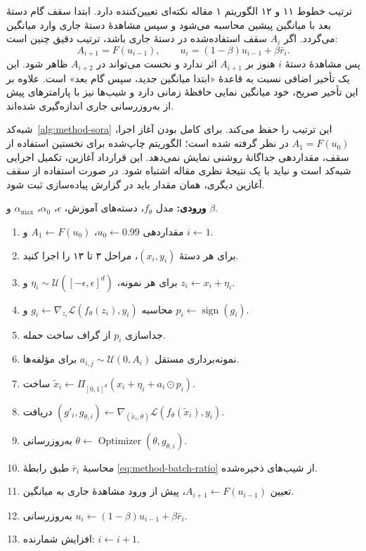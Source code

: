 ترتیب خطوط ۱۱ و ۱۲ الگوریتم ۱ مقاله نکته‌ای تعیین‌کننده دارد. ابتدا سقف گام دستهٔ بعد با میانگین پیشین محاسبه می‌شود و سپس مشاهدهٔ دستهٔ جاری وارد میانگین می‌گردد. اگر $A_i$ سقف استفاده‌شده در دستهٔ جاری باشد، ترتیب دقیق چنین است:
\begin{equation}
A_{i+1}=F(u_{i-1}),\qquad
u_i=(1-\beta)u_{i-1}+\beta\bar r_i.
\label{eq:method-extra-lag}
\end{equation}
پس مشاهدهٔ دستهٔ $i$ هنوز بر $A_{i+1}$ اثر ندارد و نخست می‌تواند در $A_{i+2}$ ظاهر شود. این یک تأخیر اضافی نسبت به قاعدهٔ «ابتدا میانگین جدید، سپس گام بعد» است. علاوه بر این تأخیر صریح، خود میانگین نمایی حافظهٔ زمانی دارد و شیب‌ها نیز با پارامترهای پیش از به‌روزرسانی جاری اندازه‌گیری شده‌اند.

شبه‌کد~\ref{alg:method-sora} این ترتیب را حفظ می‌کند. برای کامل بودن آغاز اجرا، $A_1=F(u_0)$ در نظر گرفته شده است؛ الگوریتم چاپ‌شده برای نخستین استفاده از سقف، مقداردهی جداگانهٔ روشنی نمایش نمی‌دهد. این قرارداد آغازین، تکمیل اجرایی شبه‌کد است و نباید با یک نتیجهٔ نظری مقاله اشتباه شود. در صورت استفاده از سقف آغازین دیگری، همان مقدار باید در گزارش پیاده‌سازی ثبت شود.

\begin{algorithm}[tbp]
\caption{بازنویسی \sora{} با حفظ ترتیب زمانی الگوریتم مقاله \cite{sora2026}}
\label{alg:method-sora}
\textbf{ورودی:} مدل $f_\theta$، دسته‌های آموزش، $\epsilon$، $\alpha_0$، $\alpha_{\max}$ و $\beta$.
\begin{enumerate}
\setlength{\itemsep}{0pt}
\item مقداردهی $u_0\gets0.99$، $A_1\gets F(u_0)$ و $i\gets1$.
\item برای هر دستهٔ $(x_i,y_i)$، مراحل ۳ تا ۱۳ را اجرا کنید.
\item برای هر نمونه، $\eta_i\sim\mathcal{U}([-\epsilon,\epsilon]^d)$ و $z_i\gets x_i+\eta_i$.
\item محاسبه $g_i\gets\nabla_{z_i}\mathcal{L}(f_\theta(z_i),y_i)$ و $p_i\gets\operatorname{sign}(g_i)$.
\item جداسازی $p_i$ از گراف ساخت حمله.
\item نمونه‌برداری مستقل $a_{i,j}\sim\mathcal{U}(0,A_i)$ برای مؤلفه‌ها.
\item ساخت $\widetilde x_i\gets\Pi_{[0,1]^d}(x_i+\eta_i+a_i\odot p_i)$.
\item دریافت $(g'_i,g_{\theta,i})\gets\nabla_{(\widetilde x_i,\theta)}\mathcal{L}(f_\theta(\widetilde x_i),y_i)$.
\item به‌روزرسانی $\theta\gets\operatorname{Optimizer}(\theta,g_{\theta,i})$.
\item محاسبهٔ $\bar r_i$ طبق رابطهٔ \eqref{eq:method-batch-ratio} از شیب‌های ذخیره‌شده.
\item تعیین $A_{i+1}\gets F(u_{i-1})$، پیش از ورود مشاهدهٔ جاری به میانگین.
\item به‌روزرسانی $u_i\gets(1-\beta)u_{i-1}+\beta\bar r_i$.
\item افزایش شمارنده: $i\gets i+1$.
\end{enumerate}
\end{algorithm}

